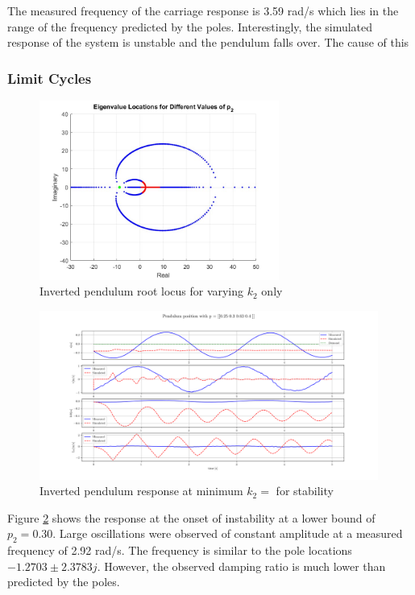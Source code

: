 \documentclass{article}
\begin{document}
The measured frequency of the carriage response is 3.59 rad/s which lies in the range of the frequency predicted by the poles.
Interestingly, the simulated response of the system is unstable and the pendulum falls over.
The cause of this 

\subsubsection{Limit Cycles}

\begin{figure}[H]
  \centering
  \includegraphics[width=0.7\textwidth]{figures/4.4roots.jpg}
  \caption{Inverted pendulum root locus for varying $k_2$ only}
  \label{fig:roots4.4}
\end{figure}

\begin{figure}[H]
  \centering
  \includegraphics[width=0.99\textwidth]{figures/4.4_lo.png}
  \caption{Inverted pendulum response at minimum $k_2 = $ for stability}
  \label{fig:roots4.4_lo}
\end{figure}

Figure \ref{fig:roots4.4_lo} shows the response at the onset of instability at a lower bound of $p_2 = 0.30$.
Large oscillations were observed of constant amplitude at a measured frequency of 2.92 rad/s.
The frequency is similar to the pole locations $-1.2703 \pm 2.3783j$.
However, the observed damping ratio is much lower than predicted by the poles.
\end{document}
